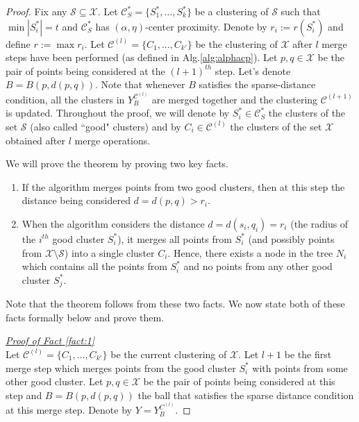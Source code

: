 \documentclass[11pt]{article}
\newcommand{\mc}{\mathcal}
\begin{document}
\begin{proof}
Fix any $\mc S \subseteq \mc X$. Let $\mc C^*_S = \{S_1^*, \ldots, S_k^*\}$ be a clustering of $\mc S$ such that $\min |S_i^*| = t$ and $\mc C^*_S$ has $(\alpha, \eta)$-center proximity. Denote by $r_i := r(S_i^*)$ and define $r := \max r_i$. Let $\mc C^{(l)} = \{C_1, \ldots, C_{k'}\}$ be the clustering of $\mc X$ after $l$ merge steps have been performed (as defined in Alg.\ref{alg:alphacp}). Let $p, q \in \mc X$ be the pair of points being considered at the $(l+1)^{th}$ step. Let's denote $B = B(p, d(p, q))$. Note that whenever $B$ satisfies the sparse-distance condition, all the clusters in $Y_{B}^{{\mc C}^{(l)}}$ are merged together and the clustering $\mc C^{(l+1)}$ is updated. Throughout the proof, we will denote by $S_i^* \in \mc C^*_S$ the clusters of the set $\mc S$ (also called ``good" clusters) and by $C_i \in \mc C^{(l)}$ the clusters of the set $\mc X$ obtained after $l$ merge operations.

\noindent We will prove the theorem by proving two key facts. %

\begin{enumerate}[nolistsep, noitemsep, label=\textbf{F.\arabic*}]
\renewcommand\labelitemi{$\diamond$}
\item \label{fact:1} If the algorithm merges points from two good clusters, then at this step the distance being considered $d = d(p,q) > r_i$.	
\item \label{fact:2} When the algorithm considers the distance $d = d(s_i, q_i) = r_i$ (the radius of the $i^{th}$ good cluster $S_i^*$), it merges all points from $S_i^*$ (and possibly points from $\mc X\setminus \mc S$) into a single cluster $C_i$. Hence, there exists a node in the tree $N_i$ which contains all the points from $S_i^*$ and no points from any other good cluster $S_j^*$. 	
\end{enumerate}
Note that the theorem follows from these two facts. We now state both of these facts formally below and prove them.

\noindent\textit{\underline{Proof of Fact \ref{fact:1} %
}}\\
Let $\mc C^{(l)} = \{C_1, \ldots, C_{k'}\}$ be the current clustering of $\mc X$. Let $l+1$ be the first merge step which merges points from the good cluster $S_i^*$ with points from some other good cluster. Let $p, q \in \mc X$ be the pair of points being considered at this step and $B = B(p, d(p, q))$ the ball that satisfies the sparse distance condition at this merge step. Denote by $Y = Y_{B}^{C^{(l)}}$.


\end{proof}
\end{document}

